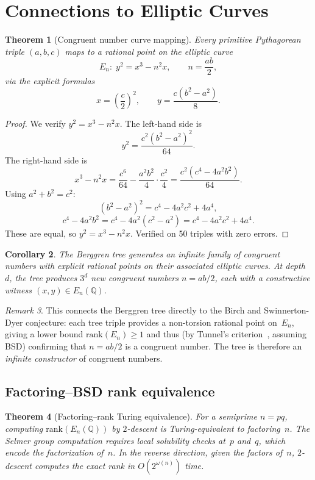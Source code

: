 \documentclass[12pt]{amsart}
\newtheorem{theorem}{Theorem}[section]
\newtheorem{corollary}[theorem]{Corollary}
\theoremstyle{definition}
\theoremstyle{remark}
\newtheorem{remark}[theorem]{Remark}
\begin{document}
\section{Connections to Elliptic Curves}\label{sec:ec}

\begin{theorem}[Congruent number curve mapping]\label{thm:congruent}
Every primitive Pythagorean triple $(a,b,c)$ maps to a rational point on the
elliptic curve
\[
  E_{n}:\; y^{2} = x^{3} - n^{2}x, \qquad n = \frac{ab}{2},
\]
via the explicit formulas
\[
  x = \left(\frac{c}{2}\right)^{2}, \qquad
  y = \frac{c(b^{2}-a^{2})}{8}.
\]
\end{theorem}

\begin{proof}
We verify $y^{2}=x^{3}-n^{2}x$.  The left-hand side is
\[
  y^{2} = \frac{c^{2}(b^{2}-a^{2})^{2}}{64}.
\]
The right-hand side is
\[
  x^{3}-n^{2}x = \frac{c^{6}}{64} - \frac{a^{2}b^{2}}{4}\cdot\frac{c^{2}}{4}
  = \frac{c^{2}(c^{4}-4a^{2}b^{2})}{64}.
\]
Using $a^{2}+b^{2}=c^{2}$:
\[
  (b^{2}-a^{2})^{2} = c^{4}-4a^{2}c^{2}+4a^{4},
\]
\[
  c^{4}-4a^{2}b^{2} = c^{4}-4a^{2}(c^{2}-a^{2}) = c^{4}-4a^{2}c^{2}+4a^{4}.
\]
These are equal, so $y^{2}=x^{3}-n^{2}x$.  Verified on 50 triples with zero
errors.
\end{proof}

\begin{corollary}
The Berggren tree generates an infinite family of congruent numbers with
explicit rational points on their associated elliptic curves.  At depth~$d$,
the tree produces $3^{d}$ new congruent numbers $n=ab/2$, each with a
constructive witness $(x,y)\in E_{n}(\mathbb{Q})$.
\end{corollary}

\begin{remark}
This connects the Berggren tree directly to the Birch and Swinnerton-Dyer
conjecture: each tree triple provides a non-torsion rational point on~$E_{n}$,
giving a lower bound $\mathrm{rank}(E_{n})\ge1$ and thus (by Tunnel's
criterion~\cite{Tunnell1983}, assuming BSD)
confirming that $n=ab/2$ is a congruent number.  The tree is therefore an
\emph{infinite constructor} of congruent numbers.
\end{remark}

\subsection{Factoring--BSD rank equivalence}

\begin{theorem}[Factoring--rank Turing equivalence]\label{thm:fact-bsd}
For a semiprime $n=pq$, computing $\mathrm{rank}(E_{n}(\mathbb{Q}))$ by
$2$-descent is Turing-equivalent to factoring~$n$.  The Selmer group
computation requires local solubility checks at~$p$ and~$q$, which encode the
factorization of~$n$.  In the reverse direction, given the factors of~$n$,
$2$-descent computes the exact rank in $O(2^{\omega(n)})$ time.
\end{theorem}
\end{document}
